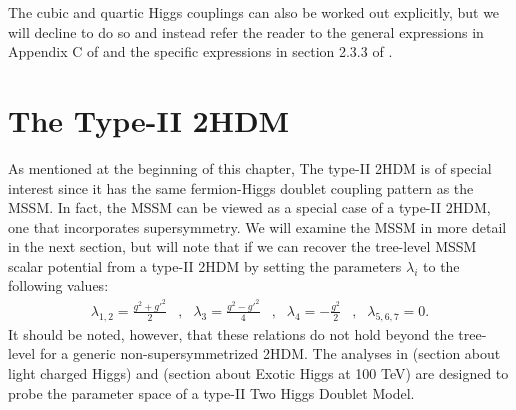 The cubic and quartic Higgs couplings can also be worked out explicitly, but we will decline to do so and instead refer the reader to the general expressions in Appendix C of  \citep{Branco2012} and the specific expressions in section 2.3.3 of \citep{Kling2016a}. 

\section{The Type-II 2HDM}

As mentioned at the beginning of this chapter, The type-II 2HDM is of special interest since it has the same fermion-Higgs doublet coupling pattern as the MSSM. In fact, the MSSM can be viewed as a special case of a type-II 2HDM, one that incorporates supersymmetry. We will examine the MSSM in more detail in the next section, but will note that if we can recover the tree-level MSSM scalar potential from a type-II 2HDM by setting the parameters $\lambda_i$ to the following values:
\begin{align}
\lambda_{1,2} = \frac{g^2+g'^2}{2} &,& \lambda_3 = \frac{g^2-g'^2}{4} &,& \lambda_4 = -\frac{g^2}{2}&,&\lambda_{5,6,7} = 0.
\end{align}
It should be noted, however, that these relations do not hold beyond the tree-level for a generic non-supersymmetrized 2HDM.
The analyses in (section about light charged Higgs) and (section about Exotic Higgs at 100 TeV) are designed to probe the parameter space of a type-II Two Higgs Doublet Model.

